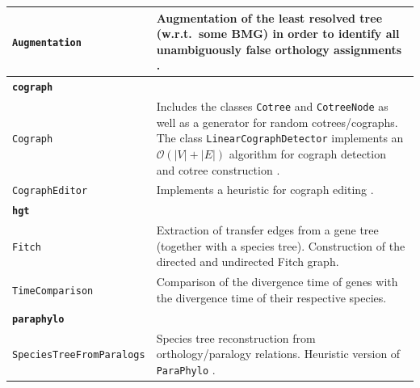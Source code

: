 \documentclass[hidelinks,11pt]{article}
\begin{document}
{\begin{longtable}{| p{4.0cm} | p{10cm} |}
	\texttt{Augmentation} &
	Augmentation of the least resolved tree (w.r.t.\ some BMG) in order to identify all unambiguously false orthology assignments \citep{schaller2020}. \\
	\hline
	\multicolumn{2}{|l|}{\textbf{\texttt{cograph}}}\\
	\hline
	\texttt{Cograph} &
	Includes the classes \texttt{Cotree} and \texttt{CotreeNode} as well as a 
	generator for random cotrees/cographs. The class 
	\texttt{LinearCographDetector} implements an $\mathcal{O}(|V|+|E|)$ algorithm 
	for cograph detection and cotree construction \citep{corneil1985}.\\
	\texttt{CographEditor} &
	Implements a heuristic for cograph editing \citep{crespelle2019}. \\
  \hline
  \multicolumn{2}{|l|}{\textbf{\texttt{hgt}}}\\
  \hline
  \texttt{Fitch} &
  Extraction of transfer edges from a gene tree (together with a species tree). 
  Construction of the directed and undirected Fitch graph.\\
  \texttt{TimeComparison} &
  Comparison of the divergence time of genes with the divergence time of their 
  respective species. \\
	\hline
	\multicolumn{2}{|l|}{\textbf{\texttt{paraphylo}}}\\
	\hline
	\texttt{SpeciesTreeFromParalogs} &
	Species tree reconstruction from orthology/paralogy relations. Heuristic version of \texttt{ParaPhylo} \cite{hellmuth2015}. \\

\end{longtable}}
\end{document}
